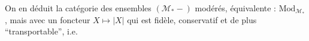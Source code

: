 On en déduit la catégorie des ensembles  $(\mathcal M_*-)$ modérés, équivalente : $\mathrm{Mod}_{\mathcal M_*}$, mais avec un foncteur
\qquad$X\longmapsto|X|$
qui est fidèle, conservatif et de plus ``transportable'', i.e.
